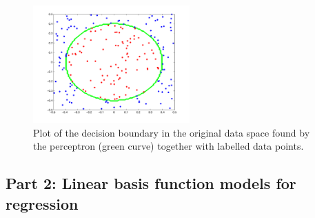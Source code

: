 \documentclass[a4]{article}
\begin{document}
\begin{figure}[!h]
\begin{center}
\centering
	\includegraphics[width=6cm]{figures/perceptron.pdf}
\end{center}
\caption{\label{fig:perceptron}Plot of the decision boundary in the original data space found by the perceptron (green curve) together with labelled data points.}
\end{figure}

\subsection{Part 2: Linear basis function models for regression}

\end{document}
